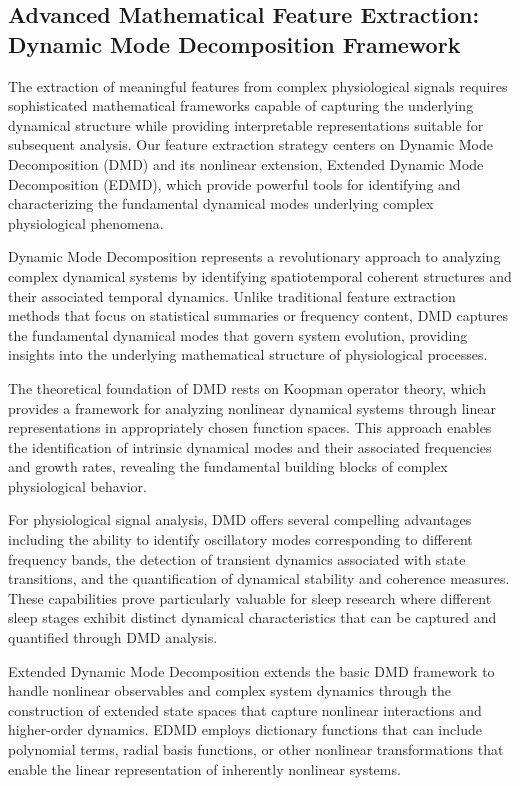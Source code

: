 \documentclass[a4paper,12pt,twoside]{article}
\begin{document}
\subsection{Advanced Mathematical Feature Extraction: Dynamic Mode Decomposition Framework}

The extraction of meaningful features from complex physiological signals requires sophisticated mathematical frameworks capable of capturing the underlying dynamical structure while providing interpretable representations suitable for subsequent analysis. Our feature extraction strategy centers on Dynamic Mode Decomposition (DMD) and its nonlinear extension, Extended Dynamic Mode Decomposition (EDMD), which provide powerful tools for identifying and characterizing the fundamental dynamical modes underlying complex physiological phenomena.

Dynamic Mode Decomposition represents a revolutionary approach to analyzing complex dynamical systems by identifying spatiotemporal coherent structures and their associated temporal dynamics. Unlike traditional feature extraction methods that focus on statistical summaries or frequency content, DMD captures the fundamental dynamical modes that govern system evolution, providing insights into the underlying mathematical structure of physiological processes.

The theoretical foundation of DMD rests on Koopman operator theory, which provides a framework for analyzing nonlinear dynamical systems through linear representations in appropriately chosen function spaces. This approach enables the identification of intrinsic dynamical modes and their associated frequencies and growth rates, revealing the fundamental building blocks of complex physiological behavior.

For physiological signal analysis, DMD offers several compelling advantages including the ability to identify oscillatory modes corresponding to different frequency bands, the detection of transient dynamics associated with state transitions, and the quantification of dynamical stability and coherence measures. These capabilities prove particularly valuable for sleep research where different sleep stages exhibit distinct dynamical characteristics that can be captured and quantified through DMD analysis.

Extended Dynamic Mode Decomposition extends the basic DMD framework to handle nonlinear observables and complex system dynamics through the construction of extended state spaces that capture nonlinear interactions and higher-order dynamics. EDMD employs dictionary functions that can include polynomial terms, radial basis functions, or other nonlinear transformations that enable the linear representation of inherently nonlinear systems.
\end{document}
